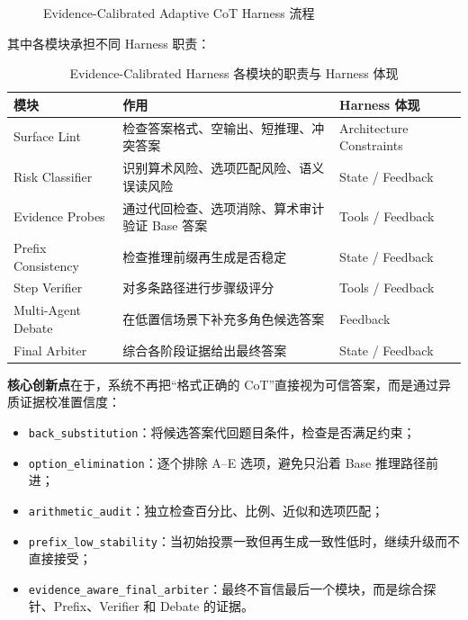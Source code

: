 \documentclass[lang=cn,a4paper,newtx]{elegantpaper}
\begin{document}
\begin{figure}[htbp]
\centering
{}
\caption{Evidence-Calibrated Adaptive CoT Harness 流程}
\label{fig:evidence-harness}
\end{figure}

其中各模块承担不同 Harness 职责：

\begin{table}[htbp]
\centering
\caption{Evidence-Calibrated Harness 各模块的职责与 Harness 体现}
\begin{tabular}{lll}
\toprule
模块 & 作用 & Harness 体现 \\
\midrule
Surface Lint & 检查答案格式、空输出、短推理、冲突答案 & Architecture Constraints \\
Risk Classifier & 识别算术风险、选项匹配风险、语义误读风险 & State / Feedback \\
Evidence Probes & 通过代回检查、选项消除、算术审计验证 Base 答案 & Tools / Feedback \\
Prefix Consistency & 检查推理前缀再生成是否稳定 & State / Feedback \\
Step Verifier & 对多条路径进行步骤级评分 & Tools / Feedback \\
Multi-Agent Debate & 在低置信场景下补充多角色候选答案 & Feedback \\
Final Arbiter & 综合各阶段证据给出最终答案 & State / Feedback \\
\bottomrule
\end{tabular}
\end{table}

\textbf{核心创新点}在于，系统不再把“格式正确的 CoT”直接视为可信答案，而是通过异质证据校准置信度：

\begin{itemize}
  \item \texttt{back\_substitution}：将候选答案代回题目条件，检查是否满足约束；
  \item \texttt{option\_elimination}：逐个排除 A--E 选项，避免只沿着 Base 推理路径前进；
  \item \texttt{arithmetic\_audit}：独立检查百分比、比例、近似和选项匹配；
  \item \texttt{prefix\_low\_stability}：当初始投票一致但再生成一致性低时，继续升级而不直接接受；
  \item \texttt{evidence\_aware\_final\_arbiter}：最终不盲信最后一个模块，而是综合探针、Prefix、Verifier 和 Debate 的证据。
\end{itemize}
\end{document}
